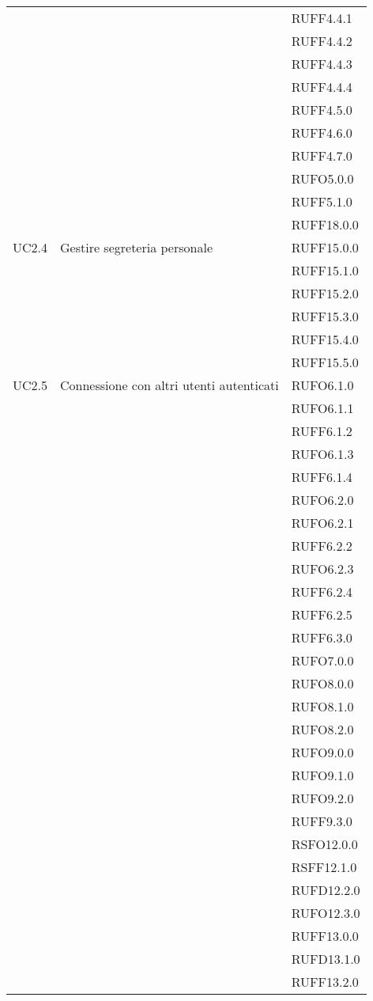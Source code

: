 \begin{longtable}{lp{}l}
 &  & RUFF4.4.1 \\
 &  & RUFF4.4.2 \\
 &  & RUFF4.4.3 \\
 &  & RUFF4.4.4 \\
 &  & RUFF4.5.0 \\
 &  & RUFF4.6.0 \\
 &  & RUFF4.7.0 \\
 &  & RUFO5.0.0 \\
 &  & RUFF5.1.0 \\
 &  & RUFF18.0.0 \\
UC2.4 & Gestire segreteria personale & RUFF15.0.0 \\
 &  & RUFF15.1.0 \\
 &  & RUFF15.2.0 \\
 &  & RUFF15.3.0 \\
 &  & RUFF15.4.0 \\
 &  & RUFF15.5.0 \\
UC2.5 & Connessione con altri utenti autenticati & RUFO6.1.0 \\
 &  & RUFO6.1.1 \\
 &  & RUFF6.1.2 \\
 &  & RUFO6.1.3 \\
 &  & RUFF6.1.4 \\
 &  & RUFO6.2.0 \\
 &  & RUFO6.2.1 \\
 &  & RUFF6.2.2 \\
 &  & RUFO6.2.3 \\
 &  & RUFF6.2.4 \\
 &  & RUFF6.2.5 \\
 &  & RUFF6.3.0 \\
 &  & RUFO7.0.0 \\
 &  & RUFO8.0.0 \\
 &  & RUFO8.1.0 \\
 &  & RUFO8.2.0 \\
 &  & RUFO9.0.0 \\
 &  & RUFO9.1.0 \\
 &  & RUFO9.2.0 \\
 &  & RUFF9.3.0 \\
 &  & RSFO12.0.0 \\
 &  & RSFF12.1.0 \\
 &  & RUFD12.2.0 \\
 &  & RUFO12.3.0 \\
 &  & RUFF13.0.0 \\
 &  & RUFD13.1.0 \\
 &  & RUFF13.2.0 \\

\end{longtable}
